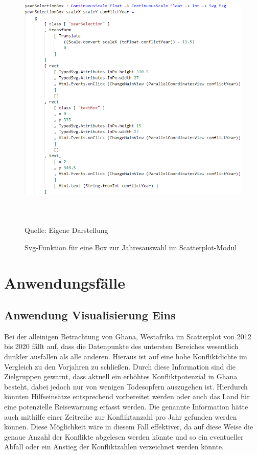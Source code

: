 \documentclass[usegeometry=true]{scrartcl}
\begin{document}
\begin{figure}[]
\begin{center}
\includegraphics[width=12cm,height=12cm,keepaspectratio]{yearSelectionBox.PNG}%
\caption{Svg-Funktion für eine Box zur Jahresauswahl im Scatterplot-Modul}
Quelle: Eigene Darstellung
\label{yearSelectionBox}
\end{center}
\end{figure}

\section{Anwendungsfälle}

\subsection{Anwendung Visualisierung Eins}
Bei der alleinigen Betrachtung von Ghana, Westafrika im Scatterplot von 2012 bis 2020 fällt auf, dass die Datenpunkte des untersten Bereiches wesentlich dunkler ausfallen als alle anderen. Hieraus ist auf eine hohe Konfliktdichte im Vergleich zu den Vorjahren zu schließen. Durch diese Information sind die Zielgruppen gewarnt, dass aktuell ein erhöhtes Konfliktpotenzial in Ghana besteht, dabei jedoch nur von wenigen Todesopfern auszugehen ist. Hierdurch könnten Hilfseinsätze entsprechend vorbereitet werden oder auch das Land für eine potenzielle Reisewarnung erfasst werden. Die genannte Information hätte auch mithilfe einer Zeitreihe zur Konfliktanzahl pro Jahr gefunden werden können. Diese Möglichkeit wäre in diesem Fall effektiver, da auf diese Weise die genaue Anzahl der Konflikte abgelesen werden könnte und so ein eventueller Abfall oder ein Anstieg der Konfliktzahlen verzeichnet werden könnte.\\
\end{document}
